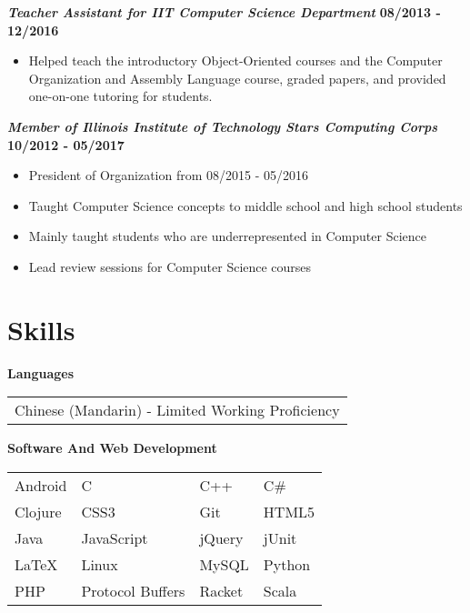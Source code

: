 \documentclass[10pt]{res}
\begin{document}
\begin{resume}
	\textbf{\textit{Teacher Assistant for IIT Computer Science Department}} 
	\vspace*{.25em}
	\hfill {\bf 08/2013 - 12/2016}
	\begin{itemize}
	  \item Helped teach the introductory Object-Oriented courses and the Computer Organization and Assembly Language course, graded papers, and provided one-on-one tutoring for students. 
	\end{itemize}
	
	\textbf{\textit{Member of Illinois Institute of Technology Stars Computing Corps}}
	\vspace*{.25em}
	\hfill {\bf 10/2012 - 05/2017}
	\begin{itemize}
  \setlength\itemsep{0em}
	  \item President of Organization from 08/2015 - 05/2016
	  \item Taught Computer Science concepts to middle school and high school students  
	  \item Mainly taught students who are underrepresented in Computer Science 
	  \item Lead review sessions for Computer Science courses 
	\end{itemize}
	
\section{Skills}
\textbf{Languages} \\ 
	\begin{tabular}{ l }
		Chinese (Mandarin) - Limited Working Proficiency
	\end{tabular}
	
	\vspace{1pt}
\textbf{Software And Web Development} \\
	\begin{tabular}{  l    l    l    l  }
		Android	           &   C 	     			    	&   C++ 			&   C\# 	\\ 
		Clojure 			& 	CSS3 	 			& 	Git	 			& 	HTML5 \\
	     Java  				& 	JavaScript 			&	jQuery            &   jUnit  	 \\
		LaTeX   			&   Linux 				&	MySQL 			&	Python   \\    	
		PHP  	 			&	Protocol Buffers   	& 	Racket         	&	Scala							
	\end{tabular}
\end{resume}
\end{document}
